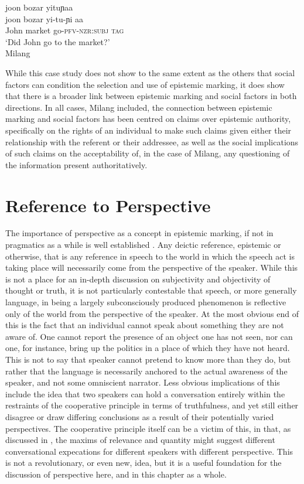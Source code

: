 \begin{exe}
    \ex \label{e:Discussion:MilangInter}
    \glll joon bozar yituɲaa \\
    joon bozar yi-tu-ɲi aa \\
    John market go-\textsc{pfv-nzr:subj} \textsc{tag} \\
    \glt `Did John go to the market?' \\
    Milang \cite[Siangic: India,][457]{Modi2017}
\end{exe}

While this case study does not show to the same extent as the others that social factors can condition the selection and use of epistemic marking, it does show that there is a broader link between epistemic marking and social factors in both directions. In all cases, Milang included, the connection between epistemic marking and social factors has been centred on claims over epistemic authority, specifically on the rights of an individual to make such claims given either their relationship with the referent or their addressee, as well as the social implications of such claims on the acceptability of, in the case of Milang, any questioning of the information present authoritatively.

\section{Reference to Perspective}\label{s:Discussion:Perspective}
The importance of perspective as a concept in epistemic marking, if not in pragmatics as a while is well established \cite{Evans2005View}. Any deictic reference, epistemic or otherwise, that is any reference in speech to the world in which the speech act is taking place will necessarily come from the perspective of the speaker. While this is not a place for an in-depth discussion on subjectivity and objectivity of thought or truth, it is not particularly contestable that speech, or more generally language, in being a largely subconsciously produced phenomenon is reflective only of the world from the perspective of the speaker. At the most obvious end of this is the fact that an individual cannot speak about something they are not aware of. One cannot report the presence of an object one has not seen, nor can one, for instance, bring up the politics in a place of which they have not heard. This is not to say that speaker cannot pretend to know more than they do, but rather that the language is necessarily anchored to the actual awareness of the speaker, and not some omniscient narrator. Less obvious implications of this include the idea that two speakers can hold a conversation entirely within the restraints of the cooperative principle in terms of truthfulness, and yet still either disagree or draw differing conclusions as a result of their potentially varied perspectives. The cooperative principle itself can be a victim of this, in that, as discussed in , the maxims of relevance and quantity might suggest different conversational expecations for different speakers with different perspective. This is not a revolutionary, or even new, idea, but it is a useful foundation for the discussion of perspective here, and in this chapter as a whole.

